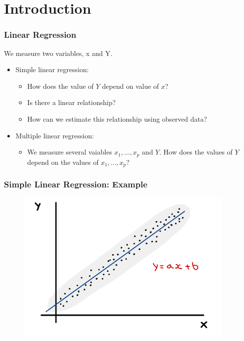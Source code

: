 




\section{Introduction} 




\begin{frame}
    \frametitle{Linear Regression}
    We measure two variables, x and Y.

    \begin{itemize}
        \item Simple linear regression:
        \begin{itemize}
            \item How does the value of $Y$ depend on value of $x$?
            \item Is there a linear relationship?
            \item How can we estimate this relationship using observed data?
        \end{itemize}
        \item Multiple linear regression:
        \begin{itemize}
            \item We measure several vaiables $x_1,...,x_p$ and $Y$. How does the values of
            $Y$ depend on the values of $x_1,...,x_p$?
        \end{itemize}
    \end{itemize}
\end{frame}

\begin{frame}
    \frametitle{Simple Linear Regression: Example}
    \begin{figure}
        \centering
        \includegraphics[width=0.95\textwidth]{sections/introduction/figures/linear_plot.pdf}
    \end{figure}
\end{frame}


